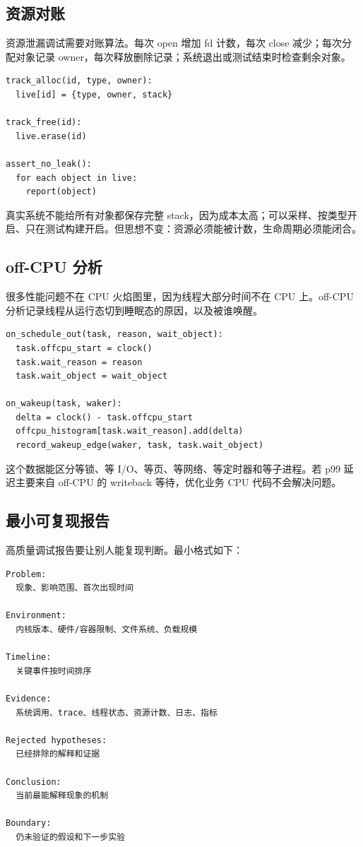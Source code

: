 \subsection{资源对账}

资源泄漏调试需要对账算法。每次 open 增加 fd 计数，每次 close 减少；每次分配对象记录 owner，每次释放删除记录；系统退出或测试结束时检查剩余对象。

\begin{lstlisting}
track_alloc(id, type, owner):
  live[id] = {type, owner, stack}

track_free(id):
  live.erase(id)

assert_no_leak():
  for each object in live:
    report(object)
\end{lstlisting}

真实系统不能给所有对象都保存完整 stack，因为成本太高；可以采样、按类型开启、只在测试构建开启。但思想不变：资源必须能被计数，生命周期必须能闭合。

\subsection{off-CPU 分析}

很多性能问题不在 CPU 火焰图里，因为线程大部分时间不在 CPU 上。off-CPU 分析记录线程从运行态切到睡眠态的原因，以及被谁唤醒。

\begin{lstlisting}
on_schedule_out(task, reason, wait_object):
  task.offcpu_start = clock()
  task.wait_reason = reason
  task.wait_object = wait_object

on_wakeup(task, waker):
  delta = clock() - task.offcpu_start
  offcpu_histogram[task.wait_reason].add(delta)
  record_wakeup_edge(waker, task, task.wait_object)
\end{lstlisting}

这个数据能区分等锁、等 I/O、等页、等网络、等定时器和等子进程。若 p99 延迟主要来自 off-CPU 的 writeback 等待，优化业务 CPU 代码不会解决问题。

\subsection{最小可复现报告}

高质量调试报告要让别人能复现判断。最小格式如下：

\begin{lstlisting}
Problem:
  现象、影响范围、首次出现时间

Environment:
  内核版本、硬件/容器限制、文件系统、负载规模

Timeline:
  关键事件按时间排序

Evidence:
  系统调用、trace、线程状态、资源计数、日志、指标

Rejected hypotheses:
  已经排除的解释和证据

Conclusion:
  当前最能解释现象的机制

Boundary:
  仍未验证的假设和下一步实验
\end{lstlisting}

